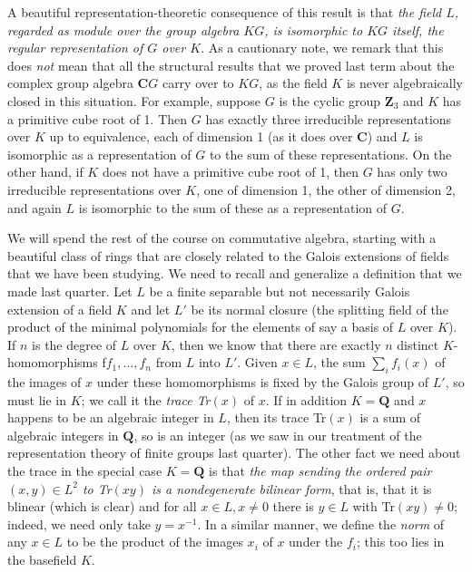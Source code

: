 \documentclass[10pt]{article}
\begin{document}
A beautiful representation-theoretic consequence of this result is that
{\sl the field $L$, regarded as module over the group algebra $KG$, is
  isomorphic to $KG$ itself, the regular representation of $G$ over
  $K$}. As a cautionary note, we remark that this does {\sl not} mean
that all the structural results that we proved last term about the
complex group algebra $\mathbf CG$ carry over to $KG$, as the field $K$
is never algebraically closed in this situation. For example, suppose
$G$ is the cyclic group $\mathbf Z_3$ and $K$ has a primitive cube root
of 1. Then $G$ has exactly three irreducible representations over $K$ up
to equivalence, each of dimension 1 (as it does over $\mathbf C$) and
$L$ is isomorphic as a representation of $G$ to the sum of these
representations. On the other hand, if $K$ does not have a primitive
cube root of 1, then $G$ has only two irreducible representations over
$K$, one of dimension 1, the other of dimension 2, and again $L$ is
isomorphic to the sum of these as a representation of $G$.

We will spend the rest of the course on commutative algebra, starting
with a beautiful class of rings that are closely related to the Galois
extensions of fields that we have been studying. We need to recall and
generalize a definition that we made last quarter. Let $L$ be a finite
separable but not necessarily Galois extension of a field $K$ and let
$L'$ be its normal closure (the splitting field of the product of the
minimal polynomials for the elements of say a basis of $L$ over $K$). If
$n$ is the degree of $L$ over $K$, then we know that there are exactly
$n$ distinct $K$-homomorphisms f$f_1,\ldots,f_n$ from $L$ into $L'$.
Given $x\in L$, the sum $\sum_i f_i(x)$ of the images of $x$ under these
homomorphisms is fixed by the Galois group of $L'$, so must lie in $K$;
we call it the {\sl trace Tr$(x)$} of $x$. If in addition $K=\mathbf Q$
and $x$ happens to be an algebraic integer in $L$, then its trace
Tr$(x)$ is a sum of algebraic integers in $\mathbf Q$, so is an integer
(as we saw in our treatment of the representation theory of finite
groups last quarter). The other fact we need about the trace in the
special case $K=\mathbf Q$ is that {\sl the map sending the ordered pair
  $(x,y)\in L^2$ to Tr$(xy)$ is a nondegenerate bilinear form}, that is,
that it is blinear (which is clear) and for all $x\in L,x\ne0$ there is
$y\in L$ with Tr$(xy)\ne0$; indeed, we need only take $y = x^{-1}$. In a
similar manner, we define the {\sl norm} of any $x\in L$ to be the
product of the images $x_i$ of $x$ under the $f_i$; this too lies in the
basefield $K$.
\end{document}
